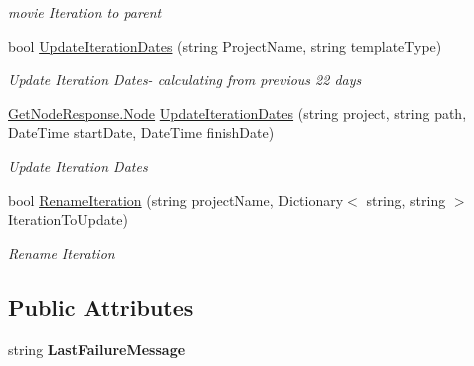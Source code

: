 \begin{DoxyCompactItemize}
\begin{DoxyCompactList}\small\item\em movie Iteration to parent \end{DoxyCompactList}\item 
bool \mbox{\hyperlink{class_vsts_rest_a_p_i_1_1_work_item_and_tracking_1_1_classification_nodes_aff3aa00e48c8f5419e7ca2a0d35946ef}{Update\+Iteration\+Dates}} (string Project\+Name, string template\+Type)
\begin{DoxyCompactList}\small\item\em Update Iteration Dates-\/ calculating from previous 22 days \end{DoxyCompactList}\item 
\mbox{\hyperlink{class_vsts_rest_a_p_i_1_1_viewmodel_1_1_work_item_1_1_get_node_response_1_1_node}{Get\+Node\+Response.\+Node}} \mbox{\hyperlink{class_vsts_rest_a_p_i_1_1_work_item_and_tracking_1_1_classification_nodes_a06d5cff8ab9703f58ffa2575abb2cdde}{Update\+Iteration\+Dates}} (string project, string path, Date\+Time start\+Date, Date\+Time finish\+Date)
\begin{DoxyCompactList}\small\item\em Update Iteration Dates \end{DoxyCompactList}\item 
bool \mbox{\hyperlink{class_vsts_rest_a_p_i_1_1_work_item_and_tracking_1_1_classification_nodes_aa9ec619ecc43346a57e84ec3206c78e3}{Rename\+Iteration}} (string project\+Name, Dictionary$<$ string, string $>$ Iteration\+To\+Update)
\begin{DoxyCompactList}\small\item\em Rename Iteration \end{DoxyCompactList}\end{DoxyCompactItemize}
\subsection*{Public Attributes}
\begin{DoxyCompactItemize}
\item 
\mbox{\label{class_vsts_rest_a_p_i_1_1_work_item_and_tracking_1_1_classification_nodes_a4c0a8a273de79ad69806b8e0bfd4d0d4}} 
string {\bfseries Last\+Failure\+Message}
\end{DoxyCompactItemize}


